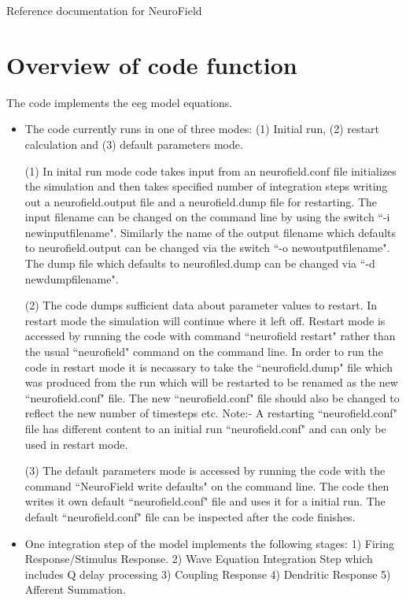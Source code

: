 \documentclass[12pt,a4paper]{article}
\begin{document}
 

{\center \Huge{Reference documentation for NeuroField}}

\section{Overview of code function}

The code implements the eeg model equations.

\begin{itemize}

\item The code currently runs in one of three modes: (1) Initial run,
(2) restart calculation and (3) default parameters mode.

(1) In inital run mode
code takes input from an neurofield.conf file
initializes the simulation and then takes specified number of integration steps
writing out a neurofield.output file and a neurofield.dump file for restarting.
The input filename can be changed on the command line by using the switch
``-i newinputfilename". Similarly the name of the output filename which defaults
to neurofield.output can be changed via the switch ``-o newoutputfilename". The
dump file which defaults to neurofiled.dump can be changed via ``-d newdumpfilename".

(2) The code dumps sufficient data about parameter values to restart. In
restart mode the simulation will continue where it left off. Restart mode is
accessed by running the code with command ``neurofield restart" rather than
the usual ``neurofield" command on the command line. In order to run the code in restart
mode it is necassary to take the ``neurofield.dump" file which was produced from
the run which will be restarted to be renamed as the
new ``neurofield.conf" file. The new ``neurofield.conf"
file should also be changed to reflect the new number of timesteps etc.
Note:- A restarting ``neurofield.conf" file has different content to an initial run
``neurofield.conf" and can only be used in restart mode.

(3) The default parameters
mode is accessed by running the code with the command ``NeuroField write defaults"
on the command line. The code then writes it own default ``neurofield.conf" file
and uses it for a initial run. The default ``neurofield.conf" file can be 
inspected after the code finishes.

\item One integration step of the model implements the following stages:
1) Firing Response/Stimulus Response. 2) Wave Equation Integration Step
which includes Q delay processing 3) Coupling Response 4) Dendritic Response
5) Afferent Summation.


\end{itemize}
\end{document}
